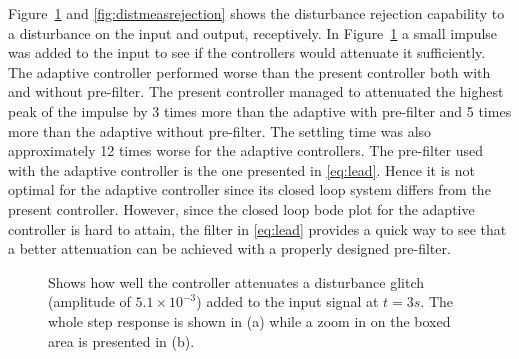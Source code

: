 Figure~\ref{fig:distrejection} and \ref{fig:distmeasrejection} shows the disturbance rejection capability to a disturbance on the input and output, receptively. In Figure~\ref{fig:distrejection} a small impulse was added to the input to see if the controllers would attenuate it sufficiently. The adaptive controller performed worse than the present controller both with and without pre-filter. The present controller managed to attenuated the highest peak of the impulse by 3 times more than the adaptive with pre-filter and 5 times more than the adaptive without pre-filter. The settling time was also approximately 12 times worse for the adaptive controllers. The pre-filter used with the adaptive controller is the one presented in \eqref{eq:lead}. Hence it is not optimal for the adaptive controller since its closed loop system differs from the present controller. However, since the closed loop bode plot for the adaptive controller is hard to attain, the filter in \eqref{eq:lead} provides a quick way to see that a better attenuation can be achieved with a properly designed pre-filter.

\begin{figure}[h!]
  \centering %
  \qquad
  \caption{\label{fig:distrejection} Shows how well the controller attenuates a disturbance glitch (amplitude of $5.1 \times 10^{-3}$) added to the input signal at $t=3s$. The whole step response is shown in (a) while a zoom in on the boxed area is presented in (b).}
\end{figure}


